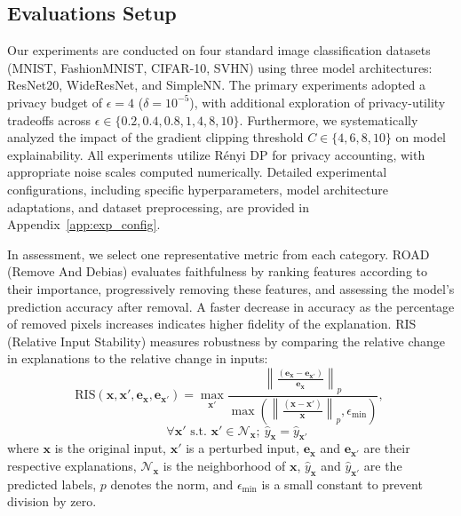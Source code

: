 \documentclass{article}
\begin{document}
\subsection{Evaluations Setup}
Our experiments are conducted on four standard image classification datasets (MNIST, FashionMNIST, CIFAR-10, SVHN) using three model architectures: ResNet20, WideResNet, and SimpleNN. The primary experiments adopted a privacy budget of $\epsilon = 4$ ($\delta = 10^{-5}$), with additional exploration of privacy-utility tradeoffs across $\epsilon \in \{0.2, 0.4, 0.8, 1, 4, 8, 10\}$. Furthermore, we systematically analyzed the impact of the gradient clipping threshold $C \in \{4, 6, 8, 10\}$ on model explainability.
All experiments utilize Rényi DP for privacy accounting, with appropriate noise scales computed numerically. Detailed experimental configurations, including specific hyperparameters, model architecture adaptations, and dataset preprocessing, are provided in Appendix~\ref{app:exp_config}.

In assessment, we select one representative metric from each category. ROAD (Remove And Debias) evaluates faithfulness by ranking features according to their importance, progressively removing these features, and assessing the model's prediction accuracy after removal. A faster decrease in accuracy as the percentage of removed pixels increases indicates higher fidelity of the explanation. RIS (Relative Input Stability) measures robustness by comparing the relative change in explanations to the relative change in inputs:
\[
\text{RIS}(\mathbf{x}, \mathbf{x}', \mathbf{e}_\mathbf{x}, \mathbf{e}_{\mathbf{x}'}) = \max_{\mathbf{x}'} \frac{\left\|\frac{(\mathbf{e}_\mathbf{x} - \mathbf{e}_{\mathbf{x}'})}{\mathbf{e}_\mathbf{x}}\right\|_p}{\max(\left\|\frac{(\mathbf{x}-\mathbf{x}')}{\mathbf{x}}\right\|_p, \epsilon_{\min})}, \
\]
\[
\quad \forall \mathbf{x}' \text{ s.t. } \mathbf{x}' \in \mathcal{N}_\mathbf{x}; \ \hat{y}_\mathbf{x} = \hat{y}_{\mathbf{x}'}
\]
where $\mathbf{x}$ is the original input, $\mathbf{x}'$ is a perturbed input, $\mathbf{e}_\mathbf{x}$ and $\mathbf{e}_{\mathbf{x}'}$ are their respective explanations, $\mathcal{N}_\mathbf{x}$ is the neighborhood of $\mathbf{x}$, $\hat{y}_\mathbf{x}$ and $\hat{y}_{\mathbf{x}'}$ are the predicted labels, $p$ denotes the norm, and $\epsilon_{\min}$ is a small constant to prevent division by zero. 
\end{document}
